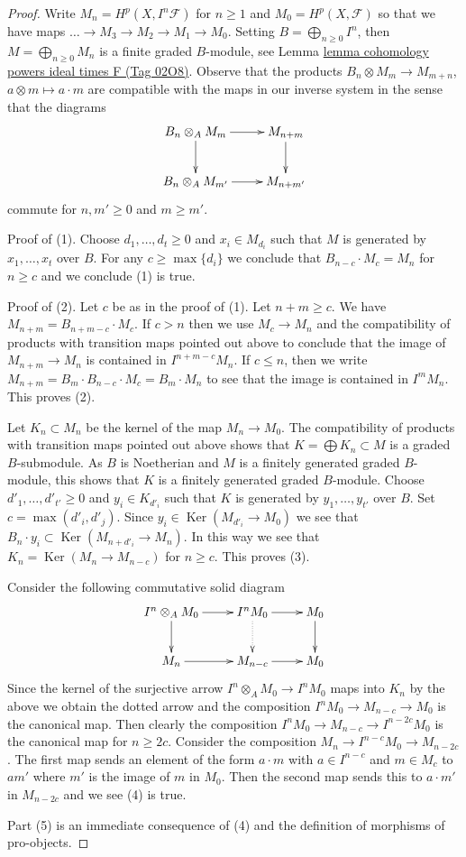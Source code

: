 \documentclass{amsart}
\theoremstyle{plain}
\theoremstyle{definition}
\theoremstyle{remark}
\numberwithin{equation}{subsection}
\def\Ker{\mathop{\mathrm{Ker}}}
\begin{document}
\begin{proof}
Write $M_n = H^p(X, I^n\mathcal{F})$ for $n \geq 1$ and
$M_0 = H^p(X, \mathcal{F})$ so that we have maps
$\ldots \to M_3 \to M_2 \to M_1 \to M_0$. Setting
$B = \bigoplus_{n \geq 0} I^n$, then $M = \bigoplus_{n \geq 0} M_n$
is a finite graded $B$-module, see
Lemma \href{https://stacks.math.columbia.edu/tag/02O8}{lemma cohomology powers ideal times F (Tag 02O8)}.
Observe that the products
$B_n \otimes M_m \to M_{m + n}$, $a \otimes m \mapsto a \cdot m$
are compatible with the maps in our inverse system in the sense
that the diagrams
$$
\xymatrix{
B_n \otimes_A M_m \ar[r] \ar[d] & M_{n + m} \ar[d] \\
B_n \otimes_A M_{m'} \ar[r] & M_{n + m'}
}
$$
commute for $n, m' \geq 0$ and $m \geq m'$.

\medskip\noindent
Proof of (1). Choose $d_1, \ldots, d_t \geq 0$ and $x_i \in M_{d_i}$
such that $M$ is generated by $x_1, \ldots, x_t$ over $B$.
For any $c \geq \max\{d_i\}$ we conclude that
$B_{n - c} \cdot M_c = M_n$ for $n \geq c$ and we conclude (1) is true.

\medskip\noindent
Proof of (2). Let $c$ be as in the proof of (1). Let $n + m \geq c$.
We have $M_{n + m} = B_{n + m - c} \cdot M_c$.
If $c > n$ then we use $M_c \to M_n$ and the compatibility of products
with transition maps pointed out above to conclude that
the image of $M_{n + m} \to M_n$ is contained in $I^{n + m - c}M_n$.
If $c \leq n$, then we write $M_{n + m} = B_m \cdot B_{n - c} \cdot M_c =
B_m \cdot M_n$ to see that the image is contained in $I^m M_n$.
This proves (2).

\medskip\noindent
Let $K_n \subset M_n$ be the kernel of the map $M_n \to M_0$. The
compatibility of products with transition maps pointed out above
shows that $K = \bigoplus K_n \subset M$ is a graded $B$-submodule.
As $B$ is Noetherian and $M$ is a finitely generated graded $B$-module,
this shows that $K$ is a finitely generated graded $B$-module.
Choose $d'_1, \ldots, d'_{t'} \geq 0$ and $y_i \in K_{d'_i}$
such that $K$ is generated by $y_1, \ldots, y_{t'}$ over $B$.
Set $c = \max(d'_i, d'_j)$. Since $y_i \in \Ker(M_{d'_i} \to M_0)$
we see that $B_n \cdot y_i \subset \Ker(M_{n + d'_i} \to M_n)$.
In this way we see that $K_n = \Ker(M_n \to M_{n - c})$ for $n \geq c$.
This proves (3).

\medskip\noindent
Consider the following commutative solid diagram
$$
\xymatrix{
I^n \otimes_A M_0 \ar[r] \ar[d] &
I^nM_0 \ar[r] \ar@{..>}[d] &
M_0 \ar[d] \\
M_n \ar[r] &
M_{n - c} \ar[r] &
M_0
}
$$
Since the kernel of the surjective arrow $I^n \otimes_A M_0 \to I^nM_0$
maps into $K_n$ by the above we obtain the dotted arrow and the
composition $I^nM_0 \to M_{n - c} \to M_0$ is the canonical map.
Then clearly the composition $I^nM_0 \to M_{n - c} \to I^{n - 2c}M_0$
is the canonical map for $n \geq 2c$. Consider the composition
$M_n \to I^{n - c}M_0 \to M_{n - 2c}$. The first map
sends an element of the form $a \cdot m$
with $a \in I^{n - c}$ and $m \in M_c$
to $a m'$ where $m'$ is the image of $m$ in $M_0$.
Then the second map sends this to $a \cdot m'$ in $M_{n - 2c}$ and
we see (4) is true.

\medskip\noindent
Part (5) is an immediate consequence of (4) and the definition of
morphisms of pro-objects.
\end{proof}
\end{document}
